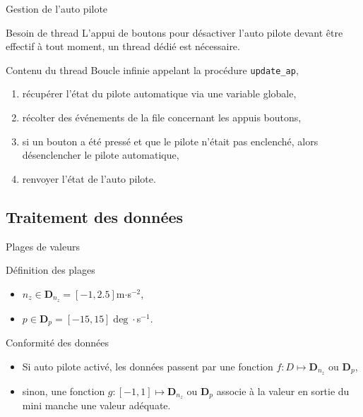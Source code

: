 \documentclass[footheight=2em]{beamer}
\begin{document}
\begin{frame}[t]{Gestion de l'auto pilote}
  \begin{block}{Besoin de thread}
    L'appui de boutons pour désactiver l'auto pilote devant être effectif à tout
    moment, un thread dédié est nécessaire.
  \end{block}
  \begin{block}{Contenu du thread}
    Boucle infinie appelant la procédure \texttt{update\_ap},
    \begin{enumerate}
      \item récupérer l'état du pilote automatique via une variable
        globale,
      \item récolter des événements de la file concernant les appuis boutons,
      \item si un bouton a été pressé et que le pilote n'était pas enclenché,
        alors désenclencher le pilote automatique,
      \item renvoyer l'état de l'auto pilote.
    \end{enumerate}
  \end{block}
\end{frame}

\subsection{Traitement des données}
\begin{frame}[t]{Plages de valeurs}
  \begin{block}{Définition des plages}
    \begin{itemize}
      \item \(n_z \in \mathbf{D}_{n_z} = [-1, 2.5]\)m\(\cdot\)s\(^{-2}\),
      \item \(p \in \mathbf{D}_p = [-15, 15]\deg\cdot\)s\(^{-1}\).
    \end{itemize}
  \end{block}
  \begin{block}{Conformité des données}
    \begin{itemize}
      \item Si auto pilote activé, les données passent par une
        fonction \(f\colon D \mapsto \mathbf{D}_{n_z}\) ou \(\mathbf{D}_p\),
      \item sinon, une fonction \(g\colon[-1, 1] \mapsto \mathbf{D}_{n_z}\) ou
        \(\mathbf{D}_p\) associe à la valeur en sortie du mini manche une valeur
        adéquate.
    \end{itemize}
  \end{block}
\end{frame}
\end{document}
